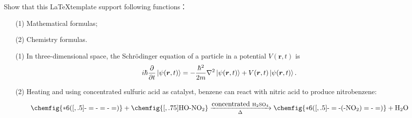\documentclass{assignment}
\begin{document}
    \begin{prob}
        Show that this \LaTeX template support following functions：
        \begin{itemize}
            \item[(1)] Mathematical formulas;
            \item[(2)] Chemistry formulas.
        \end{itemize}
    \end{prob}
    \begin{sol}
        \begin{itemize}
            \item[(1)] In three-dimensional space, the Schrödinger equation of a particle in a potential $V(\bm{r},t)$ is
            \begin{equation}
                i\hbar\frac{\partial}{\partial t}\left\lvert\psi(\bm{r},t)\right\rangle=-\frac{\hbar^2}{2m}\nabla^2\left\lvert\psi(\bm{r},t)\right\rangle+V(\bm{r},t)\left\lvert\psi(\bm{r},t)\right\rangle.
            \end{equation}
            \item[(2)] Heating and using concentrated sulfuric acid as catalyst, benzene can react with nitric acid to produce nitrobenzene:
            \begin{equation}
                \ce{\chemfig{*6([,.5]-=-=-=)} + \chemfig{[,.75]HO-NO_2} ->[\mbox{concentrated }H2SO4][$\Delta$] \chemfig{*6([,.5]-=-(-NO_2)=-=)} + H2O}
            \end{equation}
        \end{itemize}
    \end{sol}

    \clearpage
\end{document}
